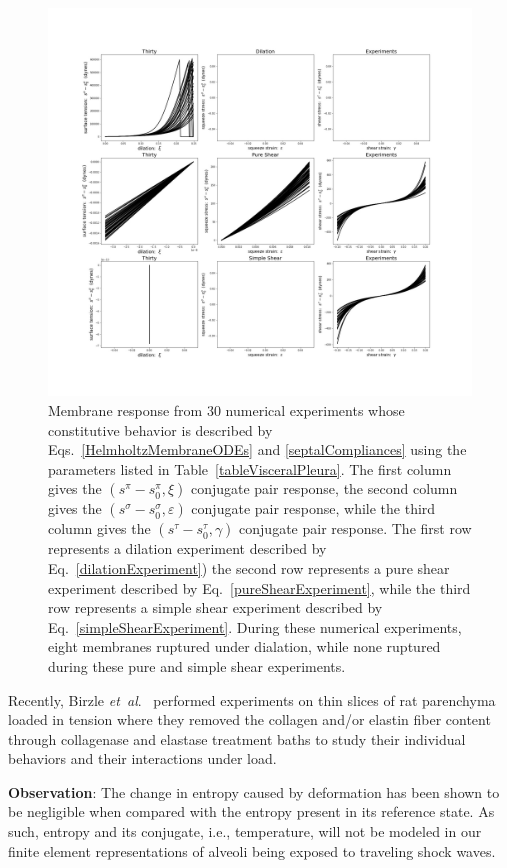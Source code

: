 \begin{figure}
    \mbox{} \hspace{-25mm}
    \includegraphics[width=1.3\textwidth]{figures/septalMembranes.jpg}
    \caption{Membrane response from 30 numerical experiments whose constitutive behavior is described by Eqs.~\ref{HelmholtzMembraneODEs} and \ref{septalCompliances} using the parameters listed in Table~\ref{tableVisceralPleura}. The first column gives the $( s^{\pi} \! - \! s_0^{\pi} , \xi)$ conjugate pair response, the second column gives the $( s^{\sigma} \! - s_0^{\sigma} , \varepsilon)$ conjugate pair response, while the third column gives the $( s^{\tau} \! - \! s_0^{\tau} , \gamma)$ conjugate pair response.  The first row represents a dilation experiment described by Eq.~\ref{dilationExperiment}) the second row represents a pure shear experiment described by Eq.~\ref{pureShearExperiment}, while the third row represents a simple shear experiment described by Eq.~\ref{simpleShearExperiment}.  During these numerical experiments, eight membranes ruptured under dialation, while none ruptured during these pure and simple shear experiments.}
    \label{figStressStrainMembranes}
\end{figure}

Recently, Birzle \textit{et~al}.\ \cite{Birzleetal19} performed experiments on thin slices of rat parenchyma loaded in tension where they removed the collagen and\slash or elastin fiber content through collagenase and elastase treatment baths to study their individual behaviors and their interactions under load.

\textbf{Observation}: The change in entropy caused by deformation has been shown to be negligible when compared with the entropy present in its reference state.  As such, entropy and its conjugate, i.e., temperature, will not be modeled in our finite element representations of alveoli being exposed to traveling shock waves.
